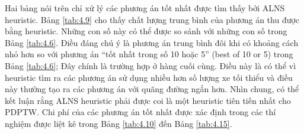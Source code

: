 Hai bảng nói trên chỉ xử lý các phương án tốt nhất được tìm thấy bởi ALNS heuristic. Bảng \ref{tab:4.9} cho thấy chất lượng trung bình của phương án thu được bằng heuristic. Những con số này có thể được so sánh với những con số trong Bảng \ref{tab:4.6}. Điều đáng chú ý là phương án trung bình đôi khi có khoảng cách nhỏ hơn so với phương án “tốt nhất trong số 10 hoặc 5” (best of 10 or 5) trong Bảng \ref{tab:4.6}; Đây chính là trường hợp ở hàng cuối cùng. Điều này là có thể vì heuristic tìm ra các phương án sử dụng nhiều hơn số lượng xe tối thiểu và điều này thường tạo ra các phương án với quãng đường ngắn hơn.
Nhìn chung, có thể kết luận rằng ALNS heuristic phải được coi là một heuristic tiên tiến nhất cho PDPTW. Chi phí của các phương án tốt nhất được xác định trong các thí nghiệm được liệt kê trong Bảng \ref{tab:4.10} đến Bảng \ref{tab:4.15}.


